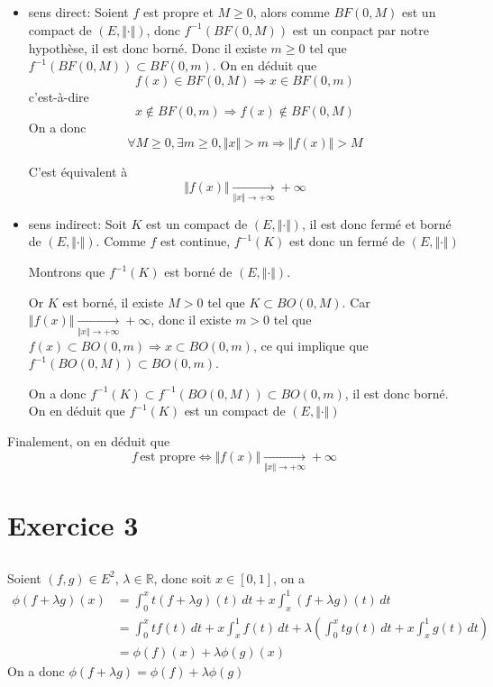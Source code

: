 \documentclass[a4paper,12pt]{book}
\begin{document}
\subsection{}
\begin{itemize}
    \item sens direct: Soient $f$ est propre et $M\geq 0$, alors comme $BF(0,M)$ est un compact de $(E,\Vert\cdot\Vert)$, donc 
    $f^{-1}(BF(0,M))$ est un conpact par notre hypothèse, il est donc borné. Donc il existe $m\geq 0$ tel que $f^{-1}(BF(0,M)) \subset BF(0,m)$. 
    On en déduit que 
    $$
    f(x) \in BF(0,M) \Rightarrow x \in BF(0,m)
    $$ 
    c'est-à-dire 
    $$
    x \notin BF(0,m) \Rightarrow f(x) \notin BF(0,M)
    $$
    On a donc 
    $$\forall M \geq 0, \exists m \geq 0, \Vert x\Vert > m \Rightarrow \Vert f(x)\Vert > M  $$

    C'est équivalent à 
    $$
    \Vert f(x) \Vert \xrightarrow[\Vert x \Vert \to +\infty]{} +\infty
    $$
    \item sens indirect: Soit $K$ est un compact de $(E,\Vert\cdot\Vert)$, il est donc fermé et borné de $(E,\Vert\cdot\Vert)$. Comme $f$ est continue, $f^{-1}(K)$ est donc un fermé de $(E,\Vert\cdot\Vert)$
    
    Montrons que $f^{-1}(K)$ est borné de $(E,\Vert\cdot\Vert)$. 

    Or $K$ est borné, il existe $M>0$ tel que $K \subset BO(0,M)$. Car $\Vert f(x) \Vert \xrightarrow[\Vert x \Vert \to +\infty]{} +\infty$, donc il existe 
    $m>0$ tel que $f(x) \subset BO(0,m)\Rightarrow x \subset BO(0,m)$, ce qui implique que $f^{-1}(BO(0,M))\subset BO(0,m)$. 

    On a donc $f^{-1}(K) \subset f^{-1}(BO(0,M))\subset BO(0,m)$, il est donc borné. On en déduit que $f^{-1}(K)$ est un compact de $(E,\Vert\cdot\Vert)$
\end{itemize}
Finalement, on en déduit que 
$$
f \,\mbox{est propre} \Leftrightarrow \Vert f(x) \Vert \xrightarrow[\Vert x \Vert \to +\infty]{} +\infty
$$
\section{Exercice 3}
\subsection{}
Soient $(f,g) \in E^2$, $\lambda \in \mathbb{R}$, donc soit $x \in [0,1]$, on a 
\begin{align*}
    \phi(f+\lambda g)(x)&=\int_0^x t (f+\lambda g)(t)\,dt+x\int_x^1(f+\lambda g)(t)\,dt\\
    &=\int_0^x t f(t)\,dt+x\int_x^1f(t)\,dt+\lambda\left(\int_0^x t g(t)\,dt+x\int_x^1g(t)\,dt\right)\\
    &=\phi(f)(x)+\lambda\phi(g)(x)
\end{align*}
On a donc $\phi(f+\lambda g)=\phi(f)+\lambda\phi(g)$
\end{document}
